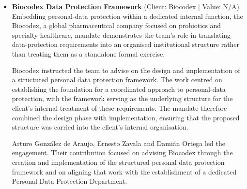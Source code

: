 \documentclass[11pt]{article}
\begin{document}
\begin{itemize}
MEGA DIRECT, S.A. de C.V. instructed the firm in connection with legal proceedings concerning data acquisition, processing, storage, and protection. Those proceedings required the team to address the full lifecycle of the relevant data: how it was acquired, processed, stored and protected, and the legal consequences arising from each of those stages. The mandate therefore placed database-related legal issues directly within the context of proceedings affecting the client’s ongoing operations.

Arturo González de Araujo, Ernesto Zavala and Damián Ortega led the representation. Their involvement across the 16-year advisory period reflects a sustained engagement with complex data protection and database-related matters, including representation in the legal proceedings concerning data acquisition, processing, storage, and protection. The work ensured business continuity in a highly regulated environment, preserving the operational relevance of the client’s data assets while those issues were addressed through the relevant legal proceedings.
\item \textbf{Biocodex Data Protection Framework} (Client: Biocodex | Value: N/A)\\ Embedding personal-data protection within a dedicated internal function, the Biocodex, a global pharmaceutical company focused on probiotics and specialty healthcare, mandate demonstrates the team’s role in translating data-protection requirements into an organised institutional structure rather than treating them as a standalone formal exercise.

Biocodex instructed the team to advise on the design and implementation of a structured personal data protection framework. The work centred on establishing the foundation for a coordinated approach to personal-data protection, with the framework serving as the underlying structure for the client’s internal treatment of these requirements. The mandate therefore combined the design phase with implementation, ensuring that the proposed structure was carried into the client’s internal organisation.

Arturo González de Araujo, Ernesto Zavala and Damián Ortega led the engagement. Their contribution focused on advising Biocodex through the creation and implementation of the structured personal data protection framework and on aligning that work with the establishment of a dedicated Personal Data Protection Department.


\end{itemize}
\end{document}
